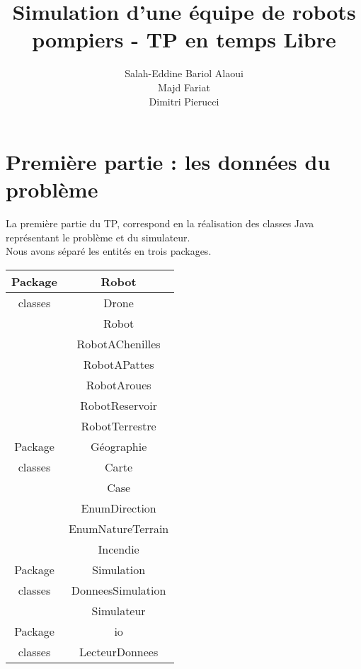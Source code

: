 \documentclass[
  oneside,
  11pt, a4paper,
  footinclude=true,
  headinclude=true,
  cleardoublepage=empty
]{scrbook}
\title{Simulation d’une équipe de robots pompiers - TP en temps Libre}
\author{Salah-Eddine Bariol Alaoui\\Majd Fariat\\Dimitri Pierucci}
\begin{document}
\maketitle

%
%
%
%
%


\chapter{Première partie : les données du problème}

La première partie du TP, correspond en la réalisation des classes Java représentant le problème et du simulateur. \\

Nous avons séparé les entités en trois packages. \\

\begin{tabular}{|c|c|}
	\hline Package & Robot \\
	\hline \hline 
	classes & Drone \\
			& Robot \\
			& RobotAChenilles \\
			& RobotAPattes \\
			& RobotAroues \\
			& RobotReservoir \\
			& RobotTerrestre \\
	\hline \hline
	Package & Géographie \\
	\hline \hline
	classes & Carte \\
			& Case \\
			& EnumDirection \\
			& EnumNatureTerrain \\
			& Incendie \\
	\hline \hline
	Package & Simulation \\
	\hline \hline
	classes & DonneesSimulation \\
			& Simulateur \\
	\hline \hline
	Package & io \\
	\hline \hline
	classes & LecteurDonnees \\
	\hline
\end{tabular} \\
\end{document}
